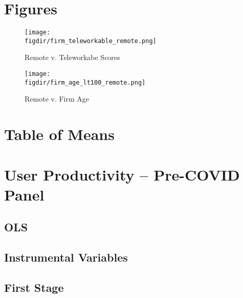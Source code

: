 \documentclass{article}
\newcommand{\cleanedresultsdir}{../../results/cleaned}
\newcommand{\figdir}{../../results/figures}
\begin{document}


\section{Figures}

\begin{figure}[H]
  \centering
  \texttt{[image: \\figdir/firm\_teleworkable\_remote.png]}
  \caption{Remote v. Teleworkabe Scores}
\end{figure}

\begin{figure}[H]
  \centering
  \texttt{[image: \\figdir/firm\_age\_lt100\_remote.png]}
  \caption{Remote v. Firm Age}
\end{figure}



\section{Table of Means}
%
\section{User Productivity – Pre-COVID Panel}

\subsection{OLS}


\subsection{Instrumental Variables}


\subsection{First Stage}

\end{document}

